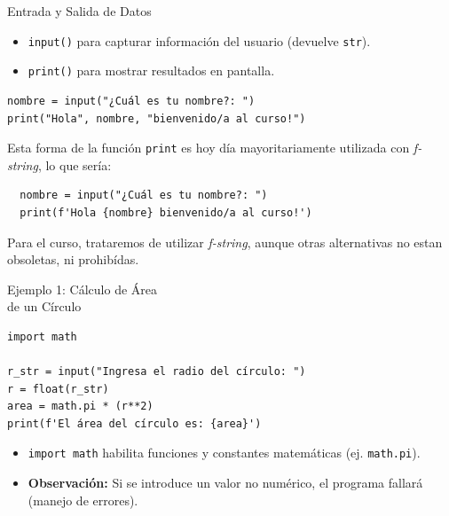 \documentclass[10pt]{beamer}
\begin{document}
\begin{frame}[fragile]{Entrada y Salida de Datos}
\begin{itemize}
  \item \texttt{input()} para capturar información del usuario (devuelve \texttt{str}).
  \item \texttt{print()} para mostrar resultados en pantalla.
\end{itemize}
\begin{verbatim}
nombre = input("¿Cuál es tu nombre?: ")
print("Hola", nombre, "bienvenido/a al curso!")
\end{verbatim}

Esta forma de la función \texttt{print} es hoy día mayoritariamente utilizada con \textit{f-string}, lo que sería:

\begin{verbatim}
  nombre = input("¿Cuál es tu nombre?: ")
  print(f'Hola {nombre} bienvenido/a al curso!')
  \end{verbatim}

  Para el curso, trataremos de utilizar \textit{f-string}, aunque otras alternativas no estan obsoletas, ni prohibídas.
\end{frame}

\begin{frame}[fragile]{Ejemplo 1: Cálculo de Área \\ de un Círculo}
\begin{verbatim}
import math

r_str = input("Ingresa el radio del círculo: ")
r = float(r_str)
area = math.pi * (r**2)
print(f'El área del círculo es: {area}')
\end{verbatim}
\begin{itemize}
  \item \texttt{import math} habilita funciones y constantes matemáticas (ej. \texttt{math.pi}).
  \item \textbf{Observación:} Si se introduce un valor no numérico, el programa fallará (manejo de errores).
\end{itemize}
\end{frame}
\end{document}
